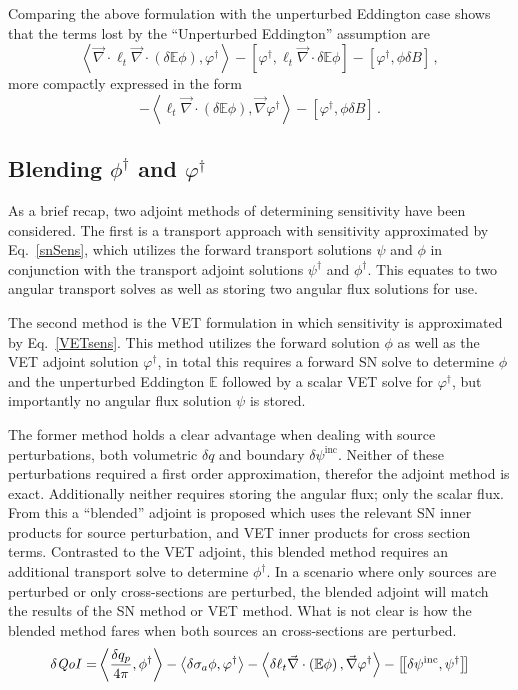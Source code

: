 \documentclass[12pt]{report}
\newcommand{\bra}{\left\langle}
\newcommand{\ket}{\right\rangle}
\newcommand{\sbraSN}{\left[ \! \left[}
\newcommand{\sketSN}{\right] \! \right]}
\newcommand{\sbra}{\left[}
\newcommand{\sket}{\right]}
\renewcommand{\div}{\vec{\nabla} \cdot}
\newcommand{\grad}{\vec{\nabla}}
\newcommand{\vefadj}{\varphi^\dag}
\newcommand{\Edd}{\mathbb{E}}
\newcommand{\BEdd}{B}
\newcommand{\siga}{\sigma_a}
\newcommand{\isigt}{\ell_t}
\newcommand{\angSourced}{\frac{\delta q_p}{4 \pi}}
\newcommand{\qoi}{{\it QoI}\xspace}
\begin{document}
Comparing the above formulation with the unperturbed Eddington case shows that the terms lost by the ``Unperturbed Eddington'' assumption are 
\begin{equation}
\label{EddErrLong}
 \bra \div \isigt \div \left( \delta \Edd \phi \right), \vefadj \ket
- \sbra  \vefadj ,\isigt \div \delta \Edd \phi \sket
- \sbra \vefadj, \phi \delta \BEdd \sket \,,
\end{equation} 
more compactly expressed in the form
\begin{equation}
\label{EddErr}
 - \bra  \isigt \div \left( \delta \Edd \phi \right), \grad \vefadj \ket
- \sbra \vefadj, \phi \delta \BEdd \sket \,.
\end{equation} 


\subsection{Blending $\phi^\dag$ and $\varphi^\dag$}
As a brief recap, two adjoint methods of determining sensitivity have been considered. The first is a transport approach with sensitivity approximated by Eq.~\eqref{snSens}, which utilizes the forward transport solutions $\psi$ and $\phi$ in conjunction with the transport adjoint solutions $\psi^\dag$ and $\phi^\dag$. This equates to two angular transport solves as well as storing two angular flux solutions for use. 

The second method is the VET formulation in which sensitivity is approximated by Eq.~\eqref{VETsens}. This method utilizes the forward solution $\phi$ as well as the VET adjoint solution $\vefadj$, in total this requires a forward SN solve to determine $\phi$ and the unperturbed Eddington $\Edd$ followed by a scalar VET solve for $\vefadj$, but importantly no angular flux solution $\psi$ is stored.

The former method holds a clear advantage when dealing with source perturbations, both volumetric $\delta q$ and boundary $\delta \psi^\text{inc}$. Neither of these perturbations required a first order approximation, therefor the adjoint method is exact. Additionally neither requires storing the angular flux; only the scalar flux. From this a ``blended'' adjoint is proposed which uses the relevant SN inner products for source perturbation, and VET inner products for cross section terms. Contrasted to the VET adjoint, this blended method requires an additional transport solve to determine $\phi^\dag$. In a scenario where only sources are perturbed or only cross-sections are perturbed, the blended adjoint will match the results of the SN method or VET method. What is not clear is how the blended method fares when both sources an cross-sections are perturbed.
\begin{equation}
\label{Blendsens}
\begin{split}
\delta \qoi =&  \bra \angSourced , \phi^\dag \ket - \bra \delta \siga \phi, \vefadj \ket - \bra \delta \isigt \div \left( \Edd \phi \right) , \grad \vefadj \ket
- \sbraSN \delta \psi^\text{inc}, \psi^\dag \sketSN \\
\end{split}
\end{equation}
\end{document}
